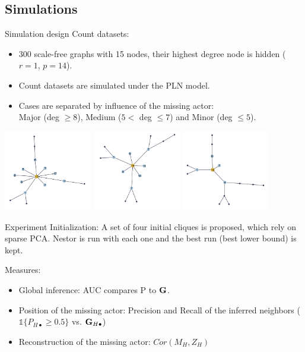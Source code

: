 \documentclass[11pt]{beamer}
\newcommand\Gb{{\bf G}}
\newcommand{\bleu}[1]{\textcolor{Framableulight}{#1}}
\begin{document}
     \subsection{Simulations}
 \begin{frame}{Simulation design}
 \bleu{Count datasets:}\\
 \begin{itemize}
 \item 300 scale-free graphs with 15 nodes, their highest degree node is hidden ($r=1$, $p=14$).
 \item Count datasets are simulated under the PLN model.
 \item Cases are separated by influence of the missing actor: \\
 Major (deg $\geq 8$), Medium ($5<$ deg $\leq 7$) and Minor (deg $\leq 5$).
 \end{itemize}
 \begin{center}
  \includegraphics[height=3.5cm]{images/major.png}
  \includegraphics[height=3.5cm]{images/medium.png}
   \includegraphics[height=3.5cm]{images/minor.png}
 \end{center}

 \end{frame}
 \begin{frame}{Experiment}
 \bleu{Initialization:}
 A set of four initial cliques is proposed, which rely on sparse PCA. Nestor is run with each one and the best run (best lower bound) is kept.\\
 \bigskip
 
 \bleu{Measures:}\\
 \begin{itemize}
 \item Global inference: AUC compares P to $\Gb$.
 \item Position of the missing actor: Precision and Recall of the inferred neighbors ($\mathds{1}\{P_{H\bullet}\geq 0.5\}$ vs. $\Gb_{H\bullet}$)
 \item Reconstruction of the missing actor: $Cor(M_H, Z_H)$
 \end{itemize}
 \end{frame}
\end{document}
